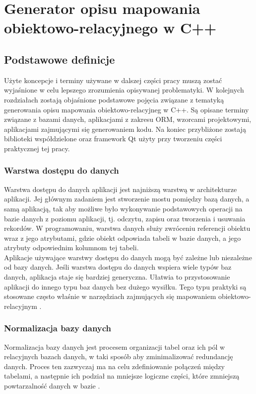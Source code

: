 \documentclass[12pt]{report}
\begin{document}
\chapter{Generator opisu mapowania obiektowo-relacyjnego w C++}\label{chap:generator}
\section{Podstawowe definicje}
Użyte koncepcje i terminy używane w dalszej części pracy muszą zostać wyjaśnione w celu lepszego zrozumienia opisywanej problematyki. W kolejnych rozdziałach zostają objaśnione podstawowe pojęcia związane z tematyką generowania opisu mapowania obiektowo-relacyjneg w C++. Są opisane terminy związane z bazami danych, aplikacjami z zakresu ORM, wzorcami projektowymi, aplikacjami zajmującymi się generowaniem kodu. Na koniec przybliżone zostają biblioteki współdzielone oraz framework Qt użyty przy tworzeniu części praktycznej tej pracy.
\subsection{Warstwa dostępu do danych}
	\indent Warstwa dostępu do danych aplikacji jest najniższą warstwą w architekturze aplikacji. Jej głównym zadaniem jest stworzenie mostu pomiędzy bazą danych, a samą aplikacją, tak aby możliwe było wykonywanie podstawowych operacji na bazie danych z poziomu aplikacji, tj. odczytu, zapisu oraz tworzenia i usuwania rekordów. W programowaniu, warstwa danych służy zwróceniu referencji obiektu wraz z jego atrybutami, gdzie obiekt odpowiada tabeli w bazie danych, a jego atrybuty odpowiednim kolumnom tej tabeli. \\
	\indent Aplikacje używające warstwy dostępu do danych mogą być zależne lub niezależne od bazy danych. Jeśli warstwa dostępu do danych wspiera wiele typów baz danych, aplikacja staje się bardziej generyczna. Ułatwia to przystosowanie aplikacji do innego typu baz danych bez dużego wysiłku. Tego typu praktyki są stosowane często właśnie w narzędziach zajmujących się mapowaniem obiektowo-relacyjnym \cite{datalayer}.
\subsection{Normalizacja bazy danych}
	\indent Normalizacja bazy danych jest procesem organizacji tabel oraz ich pól w relacyjnych bazach danych, w taki sposób aby zminimalizować redundancję danych. Proces ten zazwyczaj ma na celu zdefiniowanie połączeń między tabelami, a następnie ich podział na mniejsze logiczne części, które zmniejszą powtarzalność danych w bazie \cite{sql}.
\end{document}
